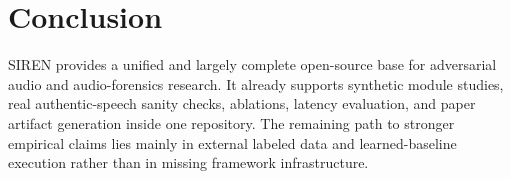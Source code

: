 \documentclass[conference]{IEEEtran}
\begin{document}
\section{Conclusion}
SIREN provides a unified and largely complete open-source base for adversarial audio and audio-forensics research. It already supports synthetic module studies, real authentic-speech sanity checks, ablations, latency evaluation, and paper artifact generation inside one repository. The remaining path to stronger empirical claims lies mainly in external labeled data and learned-baseline execution rather than in missing framework infrastructure.
\end{document}
